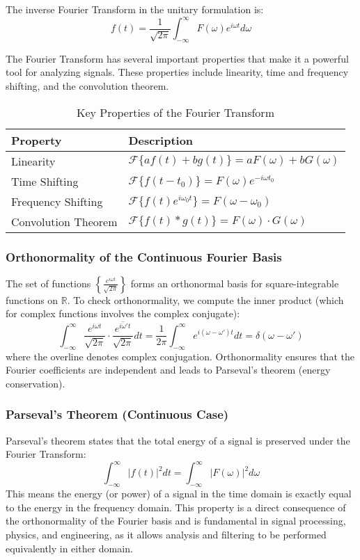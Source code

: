\documentclass[11pt,a4paper]{article}
\begin{document}
The inverse Fourier Transform in the unitary formulation is:
\begin{equation}
f(t) = \frac{1}{\sqrt{2\pi}} \int_{-\infty}^{\infty} F(\omega) e^{i\omega t} d\omega
\end{equation}

The Fourier Transform has several important properties that make it a powerful tool for analyzing signals. These properties include linearity, time and frequency shifting, and the convolution theorem.

\begin{table}[h!]
\centering
\begin{tabular}{|l|l|}
\hline
\textbf{Property} & \textbf{Description} \\
\hline
Linearity & $\mathcal{F}\{af(t) + bg(t)\} = aF(\omega) + bG(\omega)$ \\
\hline
Time Shifting & $\mathcal{F}\{f(t-t_0)\} = F(\omega)e^{-i\omega t_0}$ \\
\hline
Frequency Shifting & $\mathcal{F}\{f(t)e^{i\omega_0 t}\} = F(\omega - \omega_0)$ \\
\hline
Convolution Theorem & $\mathcal{F}\{f(t) * g(t)\} = F(\omega) \cdot G(\omega)$ \\
\hline
\end{tabular}
\caption{Key Properties of the Fourier Transform}
\end{table}

\subsubsection*{Orthonormality of the Continuous Fourier Basis}
The set of functions $\left\{\frac{e^{i\omega t}}{\sqrt{2\pi}}\right\}$ forms an orthonormal basis for square-integrable functions on $\mathbb{R}$. To check orthonormality, we compute the inner product (which for complex functions involves the complex conjugate):
\begin{equation}
\int_{-\infty}^{\infty} \frac{e^{i\omega t}}{\sqrt{2\pi}} \cdot \overline{\frac{e^{i\omega' t}}{\sqrt{2\pi}}} dt = \frac{1}{2\pi} \int_{-\infty}^{\infty} e^{i(\omega-\omega')t} dt = \delta(\omega-\omega')
\end{equation}
where the overline denotes complex conjugation. Orthonormality ensures that the Fourier coefficients are independent and leads to Parseval's theorem (energy conservation).

\subsubsection*{Parseval's Theorem (Continuous Case)}
Parseval's theorem states that the total energy of a signal is preserved under the Fourier Transform:
\begin{equation}
\int_{-\infty}^{\infty} |f(t)|^2 dt = \int_{-\infty}^{\infty} |F(\omega)|^2 d\omega
\end{equation}
This means the energy (or power) of a signal in the time domain is exactly equal to the energy in the frequency domain. This property is a direct consequence of the orthonormality of the Fourier basis and is fundamental in signal processing, physics, and engineering, as it allows analysis and filtering to be performed equivalently in either domain.
\end{document}
